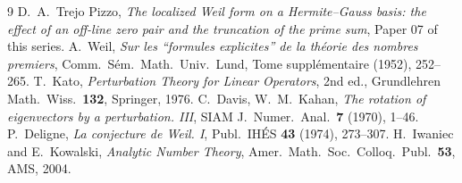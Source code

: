 \documentclass[11pt]{amsart}
\theoremstyle{definition}
\theoremstyle{remark}
\begin{document}
\begin{thebibliography}{9}
 D.~A.~Trejo Pizzo, \emph{The localized Weil form on a Hermite--Gauss basis: the effect of an off-line zero pair and the truncation of the prime sum}, Paper 07 of this series.
 A.~Weil, \emph{Sur les ``formules explicites'' de la th\'eorie des nombres premiers}, Comm.\ S\'em.\ Math.\ Univ.\ Lund, Tome suppl\'ementaire (1952), 252--265.
 T.~Kato, \emph{Perturbation Theory for Linear Operators}, 2nd ed., Grundlehren Math.\ Wiss.\ \textbf{132}, Springer, 1976.
 C.~Davis, W.~M.~Kahan, \emph{The rotation of eigenvectors by a perturbation. III}, SIAM J.\
Numer.\ Anal.\ \textbf{7} (1970), 1--46.
 P.~Deligne, \emph{La conjecture de Weil. I}, Publ.\ IHÉS \textbf{43} (1974), 273--307.
\bibitem{bgIK} H.~Iwaniec and E.~Kowalski, \emph{Analytic Number Theory}, Amer.\ Math.\ Soc.\ Colloq.\ Publ.\ \textbf{53}, AMS, 2004.
\end{thebibliography}
\end{document}
